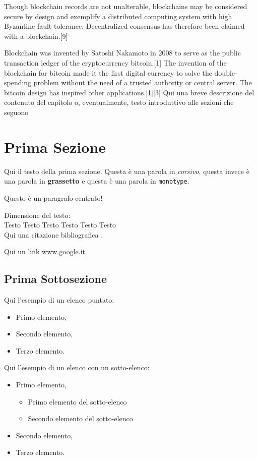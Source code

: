 Though blockchain records are not unalterable, blockchains may be considered secure by design and exemplify a distributed computing system with high Byzantine fault tolerance. Decentralized consensus has therefore been claimed with a blockchain.[9]

Blockchain was invented by Satoshi Nakamoto in 2008 to serve as the public transaction ledger of the cryptocurrency bitcoin.[1] The invention of the blockchain for bitcoin made it the first digital currency to solve the double-spending problem without the need of a trusted authority or central server. The bitcoin design has inspired other applications.[1][3]
Qui una breve descrizione del contenuto del capitolo o, eventualmente, testo introduttivo alle sezioni che seguono

\section{Prima Sezione}
Qui il testo della prima sezione. Questa è  una parola in \textit{corsivo}, questa invece è una parola in \textbf{grassetto} e questa è una parola in \texttt{monotype}.

\begin{center}
Questo è un paragrafo centrato!
\end{center}

Dimensione del testo:\\

\LARGE{Testo} \Large{Testo} \large{Testo} \normalsize{Testo} \small{Testo} \footnotesize{Testo}\\

Qui una citazione bibliografica \cite{bib001}.

Qui un link \url{www.google.it}


\subsection{Prima Sottosezione}

Qui l'esempio di un elenco puntato:

\begin{itemize}
\item Primo elemento,
\item Secondo elemento,
\item Terzo elemento.
\end{itemize}

Qui l'esempio di un elenco con un sotto-elenco:

\begin{itemize}
\item Primo elemento,
\begin{itemize}
\item Primo elemento del sotto-elenco
\item Secondo elemento del sotto-elenco
\end{itemize}
\item Secondo elemento,
\item Terzo elemento.
\end{itemize}

